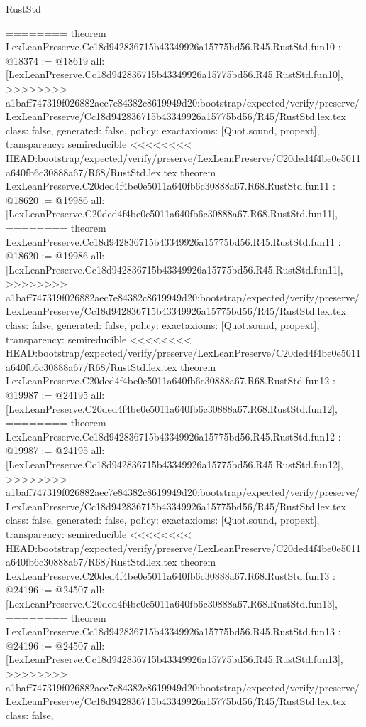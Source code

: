 \begin{lexlean}{RustStd}
\begin{coremodule}
{\begin{coremodule}
{{{{{{{{{{{{{========
theorem LexLeanPreserve.Cc18d942836715b43349926a15775bd56.R45.RustStd.fun10 : @18374 := @18619 {
  all: [LexLeanPreserve.Cc18d942836715b43349926a15775bd56.R45.RustStd.fun10],
>>>>>>>> a1baff747319f026882aec7e84382c8619949d20:bootstrap/expected/verify/preserve/LexLeanPreserve/Cc18d942836715b43349926a15775bd56/R45/RustStd.lex.tex
  class: false,
  generated: false,
  policy: exact{axioms: [Quot.sound, propext]},
  transparency: semireducible
}
<<<<<<<< HEAD:bootstrap/expected/verify/preserve/LexLeanPreserve/C20ded4f4be0e5011a640fb6c30888a67/R68/RustStd.lex.tex
theorem LexLeanPreserve.C20ded4f4be0e5011a640fb6c30888a67.R68.RustStd.fun11 : @18620 := @19986 {
  all: [LexLeanPreserve.C20ded4f4be0e5011a640fb6c30888a67.R68.RustStd.fun11],
========
theorem LexLeanPreserve.Cc18d942836715b43349926a15775bd56.R45.RustStd.fun11 : @18620 := @19986 {
  all: [LexLeanPreserve.Cc18d942836715b43349926a15775bd56.R45.RustStd.fun11],
>>>>>>>> a1baff747319f026882aec7e84382c8619949d20:bootstrap/expected/verify/preserve/LexLeanPreserve/Cc18d942836715b43349926a15775bd56/R45/RustStd.lex.tex
  class: false,
  generated: false,
  policy: exact{axioms: [Quot.sound, propext]},
  transparency: semireducible
}
<<<<<<<< HEAD:bootstrap/expected/verify/preserve/LexLeanPreserve/C20ded4f4be0e5011a640fb6c30888a67/R68/RustStd.lex.tex
theorem LexLeanPreserve.C20ded4f4be0e5011a640fb6c30888a67.R68.RustStd.fun12 : @19987 := @24195 {
  all: [LexLeanPreserve.C20ded4f4be0e5011a640fb6c30888a67.R68.RustStd.fun12],
========
theorem LexLeanPreserve.Cc18d942836715b43349926a15775bd56.R45.RustStd.fun12 : @19987 := @24195 {
  all: [LexLeanPreserve.Cc18d942836715b43349926a15775bd56.R45.RustStd.fun12],
>>>>>>>> a1baff747319f026882aec7e84382c8619949d20:bootstrap/expected/verify/preserve/LexLeanPreserve/Cc18d942836715b43349926a15775bd56/R45/RustStd.lex.tex
  class: false,
  generated: false,
  policy: exact{axioms: [Quot.sound, propext]},
  transparency: semireducible
}
<<<<<<<< HEAD:bootstrap/expected/verify/preserve/LexLeanPreserve/C20ded4f4be0e5011a640fb6c30888a67/R68/RustStd.lex.tex
theorem LexLeanPreserve.C20ded4f4be0e5011a640fb6c30888a67.R68.RustStd.fun13 : @24196 := @24507 {
  all: [LexLeanPreserve.C20ded4f4be0e5011a640fb6c30888a67.R68.RustStd.fun13],
========
theorem LexLeanPreserve.Cc18d942836715b43349926a15775bd56.R45.RustStd.fun13 : @24196 := @24507 {
  all: [LexLeanPreserve.Cc18d942836715b43349926a15775bd56.R45.RustStd.fun13],
>>>>>>>> a1baff747319f026882aec7e84382c8619949d20:bootstrap/expected/verify/preserve/LexLeanPreserve/Cc18d942836715b43349926a15775bd56/R45/RustStd.lex.tex
  class: false,
}}}}}}}}}}}}}}}}}
\end{coremodule}}
\end{coremodule}
\end{lexlean}
